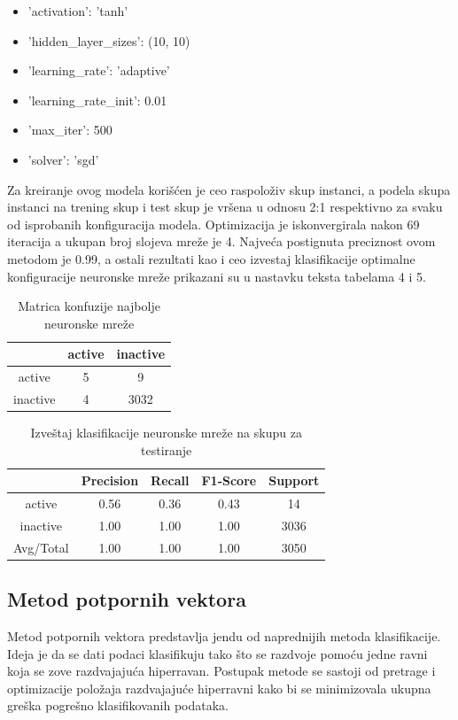 \documentclass[12pt]{article}
\begin{document}
\begin{itemize}

	\item 'activation': 'tanh'
	\item 'hidden\_layer\_sizes': (10, 10)
	\item 'learning\_rate': 'adaptive'
	\item 'learning\_rate\_init': 0.01
	\item 'max\_iter': 500
	\item 'solver': 'sgd'

\end{itemize}

Za kreiranje ovog modela korišćen je ceo raspoloživ skup instanci, a podela skupa instanci na trening skup i test skup je vršena u odnosu 2:1 respektivno za svaku od isprobanih konfiguracija modela. Optimizacija je iskonvergirala nakon 69 iteracija a ukupan broj slojeva mreže je 4.  Najveća postignuta preciznost ovom metodom je 0.99, a ostali rezultati kao i ceo izvestaj klasifikacije optimalne konfiguracije neuronske mreže prikazani su u nastavku teksta tabelama 4 i 5.  


\begin{table}[h]
\caption{Matrica konfuzije najbolje neuronske mreže}
\centering
\begin{tabular}{|c|c|c|}
        	\hline
	& active & inactive \\
        	\hline
	active & 5 & 9 \\
	\hline
        	inactive & 4 & 3032  \\
	\hline
\end{tabular}
\end{table}


\begin{table}[h]
\caption{Izveštaj klasifikacije neuronske mreže na skupu za testiranje}
\centering
\begin{tabular}{|c|c|c|c|c|}
        	\hline
	& Precision & Recall & F1-Score & Support \\
        	\hline
	active & 0.56 & 0.36 & 0.43 & 14 \\
        	\hline
	inactive & 1.00 & 1.00 & 1.00 & 3036 \\
        	\hline
	Avg/Total & 1.00 & 1.00 & 1.00 & 3050 \\
	\hline
\end{tabular}
\end{table}

\subsection {Metod potpornih vektora}
Metod potpornih vektora predstavlja jendu od naprednijih metoda klasifikacije. Ideja je da se dati podaci klasifikuju tako što se razdvoje pomoću jedne ravni koja se zove razdvajajuća hiperravan. Postupak metode se sastoji od pretrage i optimizacije položaja razdvajajuće hiperravni kako bi se minimizovala ukupna greška pogrešno klasifikovanih podataka.
\end{document}

